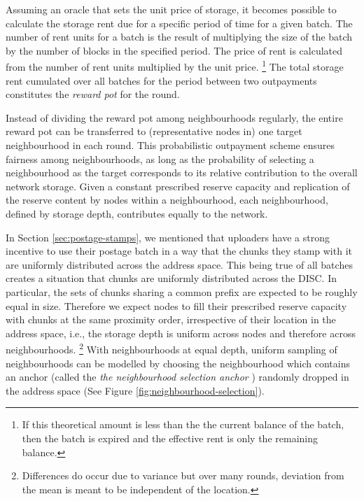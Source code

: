 Assuming an oracle that sets the unit price of storage, it becomes possible to calculate the storage rent due for a specific period of time for a given batch. The number of rent units for a batch is the result of multiplying the size of the batch by the number of blocks in the specified period. The price of rent is calculated from the number of rent units multiplied by the unit price.%
%
\footnote{If this theoretical amount is less than the the current balance of the batch, then the batch is expired and the effective rent is only the remaining balance.}
%
The total storage rent cumulated over all batches for the period between two outpayments constitutes the \emph{reward pot} for the round.

Instead of dividing the reward pot among neighbourhoods regularly, the entire reward pot can be transferred to (representative nodes in) one target neighbourhood in each round. This probabilistic outpayment scheme ensures fairness among neighbourhoods, as long as the probability of selecting a neighbourhood as the target corresponds to its relative contribution to the overall network storage. Given a constant prescribed reserve capacity and replication of the reserve content by nodes within a neighbourhood, each neighbourhood, defined by storage depth, contributes equally to the network. 

In Section \ref{sec:postage-stamps}, we mentioned that uploaders have a strong incentive to use their postage batch in a way that the chunks they stamp with it are uniformly distributed across the address space. This being true of all batches creates a situation that chunks are uniformly distributed across the DISC. In particular, the sets of chunks sharing a common prefix are expected to be roughly equal in size. Therefore we expect nodes to fill their prescribed reserve capacity with chunks at the same proximity order, irrespective of their location in the address space, i.e., the storage depth is uniform across  nodes and therefore across neighbourhoods.%
%
\footnote{Differences do occur due to variance but over many rounds, deviation from the mean is meant to be independent of the location.}
%
With neighbourhoods at equal depth, uniform sampling of neighbourhoods can be modelled by choosing the neighbourhood which contains an anchor (called the \emph{the neighbourhood selection anchor}%
%
%
) randomly dropped in the address space (See Figure \ref{fig:neighbourhood-selection}).


